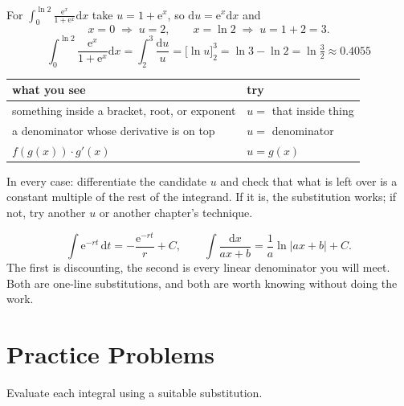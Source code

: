 \begin{worked}
For $\int_{0}^{\ln2}\frac{\mathrm{e}^{x}}{1+\mathrm{e}^{x}}\mathrm{d}x$
take $u=1+\mathrm{e}^{x}$, so $\mathrm{d}u=\mathrm{e}^{x}\mathrm{d}x$ and
\[
  x=0\;\Rightarrow\;u=2,
  \qquad
  x=\ln2\;\Rightarrow\;u=1+2=3 .
\]
\[
  \int_{0}^{\ln2}\frac{\mathrm{e}^{x}}{1+\mathrm{e}^{x}}\mathrm{d}x
  =\int_{2}^{3}\frac{\mathrm{d}u}{u}
  =\bigl[\ln u\bigr]_{2}^{3}
  =\ln3-\ln2=\boxed{\ln\tfrac32\approx0.4055}
\]

\begin{center}\footnotesize
\begin{tabular}{ll}
  \hline
  what you see & try\\
  \hline
  something inside a bracket, root, or exponent & $u=$ that inside thing\\
  a denominator whose derivative is on top & $u=$ denominator\\
  $f(g(x))\cdot g'(x)$ & $u=g(x)$\\
  \hline
\end{tabular}
\end{center}
In every case: differentiate the candidate $u$ and check that what is left
over is a constant multiple of the rest of the integrand. If it is, the
substitution works; if not, try another $u$ or another chapter's technique.

\[
  \int\mathrm{e}^{-rt}\,\mathrm{d}t=-\frac{\mathrm{e}^{-rt}}{r}+C,
  \qquad
  \int\frac{\mathrm{d}x}{ax+b}=\frac{1}{a}\ln|ax+b|+C .
\]
The first is discounting, the second is every linear denominator you will
meet. Both are one-line substitutions, and both are worth knowing without
doing the work.
\end{worked}

\section{Practice Problems}

Evaluate each integral using a suitable substitution.

